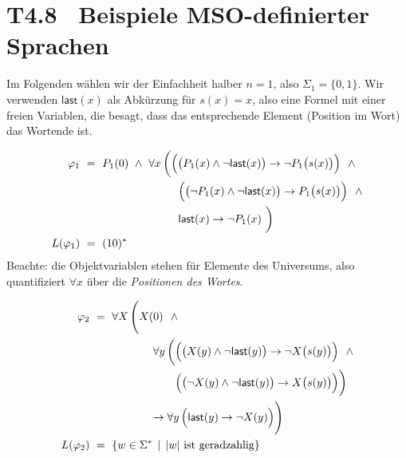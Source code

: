 \documentclass[fontsize=11pt, twoside=false, numbers=autoenddot]{scrbook}
\begin{document}
\section*{T4.8~ Beispiele MSO-definierter Sprachen}

Im Folgenden wählen wir der Einfachheit halber $n=1$, also $\Sigma_1 = \{0,1\}$.
Wir verwenden $\textsf{last}(x)$ als Abkürzung für $s(x)=x$,
also eine Formel mit einer freien Variablen, die besagt,
dass das entsprechende Element (Position im Wort) das Wortende ist.

\par\medskip\noindent
{}
%
\begin{align*}
  \varphi_1    & ~=~ P_1(0) ~\land~ \forall x\,\bigg(
                                    \Big(\big(P_1(x) \land \lnot \textsf{last}(x)\big) \to \lnot P_1\big(s(x)\big)\Big) ~~\land \\
               &     \hspace*{31mm} \Big(\big(\lnot P_1(x) \land \lnot \textsf{last}(x)\big) \to P_1\big(s(x)\big)\Big) ~~\land \\
               &     \hspace*{31mm} \textsf{last}(x) \to \lnot P_1(x)~\bigg) \\
  L(\varphi_1) & ~=~ (10)^*
\end{align*}
%
Beachte: die Objektvariablen stehen für Elemente des Universums,
also quantifiziert $\forall x$ über die \emph{Positionen des Wortes}.

\goodbreak
\par\medskip\noindent
{}
%
\begin{align*}
  \varphi_2    & ~=~ \forall X\,\Bigg( X(0) ~~\land \\
               &     \hspace*{20mm} \forall y\, \bigg( \Big( \big(X(y) \land \lnot \textsf{last}(y)\big) \to \lnot X\big(s(y)\big) \Big)~~\land \\
               &     \hspace*{27mm}                    \Big( \big(\lnot X(y) \land \lnot \textsf{last}(y)\big) \to X\big(s(y)\big) \Big) \bigg) \\
               &     \hspace*{19mm} \to \forall y\, \Big(\textsf{last}(y) \to \lnot X(y) \Big) \Bigg) \\
  L(\varphi_2) & ~=~ \{w \in \Sigma^* \,\mid\, |w| \text{~ist geradzahlig}\}
\end{align*}
%
\end{document}
